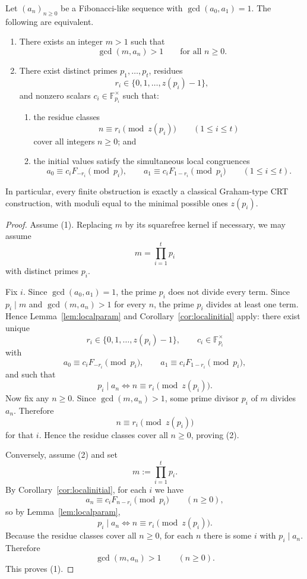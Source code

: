 \begin{theorem}\label{thm:classification}
Let $(a_n)_{n\ge 0}$ be a Fibonacci-like sequence with $\gcd(a_0,a_1)=1$. The following are equivalent.
\begin{enumerate}
\item[(1)] There exists an integer $m>1$ such that
\[
\gcd(m,a_n)>1 \qquad \text{for all } n\ge 0.
\]
\item[(2)] There exist distinct primes $p_1,\dots,p_t$, residues
\[
r_i\in\{0,1,\dots,z(p_i)-1\},
\]
and nonzero scalars $c_i\in\mathbb F_{p_i}^{\times}$ such that:
\begin{enumerate}
\item[(a)] the residue classes
\[
n\equiv r_i\pmod{z(p_i)} \qquad (1\le i\le t)
\]
cover all integers $n\ge 0$; and
\item[(b)] the initial values satisfy the simultaneous local congruences
\[
a_0\equiv c_iF_{-r_i}\pmod{p_i},
\qquad
 a_1\equiv c_iF_{1-r_i}\pmod{p_i}
\qquad (1\le i\le t).
\]
\end{enumerate}
\end{enumerate}
In particular, every finite obstruction is exactly a classical Graham-type CRT construction, with moduli equal to the minimal possible ones $z(p_i)$.
\end{theorem}
\begin{proof}
Assume \textup{(1)}. Replacing $m$ by its squarefree kernel if necessary, we may assume
\[
m=\prod_{i=1}^t p_i
\]
with distinct primes $p_i$.

Fix $i$. Since $\gcd(a_0,a_1)=1$, the prime $p_i$ does not divide every term. Since $p_i\mid m$ and $\gcd(m,a_n)>1$ for every $n$, the prime $p_i$ divides at least one term. Hence Lemma~\ref{lem:localparam} and Corollary~\ref{cor:localinitial} apply: there exist unique
\[
r_i\in\{0,1,\dots,z(p_i)-1\},\qquad c_i\in\mathbb F_{p_i}^{\times}
\]
with
\[
a_0\equiv c_iF_{-r_i}\pmod{p_i},
\qquad
 a_1\equiv c_iF_{1-r_i}\pmod{p_i},
\]
and such that
\[
p_i\mid a_n \iff n\equiv r_i\pmod{z(p_i)}.
\]
Now fix any $n\ge 0$. Since $\gcd(m,a_n)>1$, some prime divisor $p_i$ of $m$ divides $a_n$. Therefore
\[
n\equiv r_i\pmod{z(p_i)}
\]
for that $i$. Hence the residue classes cover all $n\ge 0$, proving \textup{(2)}.

Conversely, assume \textup{(2)} and set
\[
m:=\prod_{i=1}^t p_i.
\]
By Corollary~\ref{cor:localinitial}, for each $i$ we have
\[
a_n\equiv c_iF_{n-r_i}\pmod{p_i}
\qquad (n\ge 0),
\]
so by Lemma~\ref{lem:localparam},
\[
p_i\mid a_n \iff n\equiv r_i\pmod{z(p_i)}.
\]
Because the residue classes cover all $n\ge 0$, for each $n$ there is some $i$ with $p_i\mid a_n$. Therefore
\[
\gcd(m,a_n)>1 \qquad (n\ge 0).
\]
This proves \textup{(1)}.
\end{proof}

